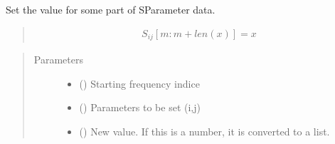\documentclass[letterpaper,10pt,english]{sphinxmanual}
\begin{document}
\begin{fulllineitems}
\begin{fulllineitems}
\end{fulllineitems}


\begin{fulllineitems}
\label{\detokenize{touchstone:touchstone.spfile.setdataformat}}
\end{fulllineitems}


\begin{fulllineitems}
\label{\detokenize{touchstone:touchstone.spfile.setdatapoint}}
Set the value for some part of S\sphinxhyphen{}Parameter data.
\begin{quote}
\begin{equation*}
\begin{split}S_{i j}[m:m+len(x)]=x\end{split}
\end{equation*}\end{quote}
\begin{quote}\begin{description}
\item[{Parameters}] \leavevmode\begin{itemize}
\item {} 
 () \textendash{} Starting frequency indice

\item {} 
 () \textendash{} Parameters to be set (i,j)

\item {} 
 () \textendash{} New value. If this is a number, it is converted to a list.

\end{itemize}


\end{description}
\end{quote}
\end{fulllineitems}
\end{fulllineitems}
\end{document}
